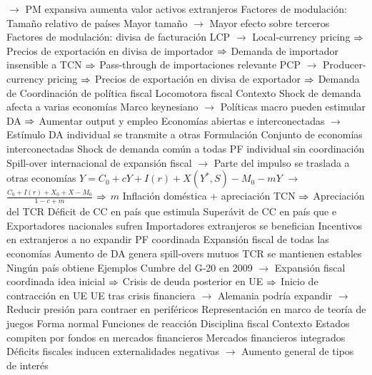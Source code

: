 \documentclass{nuevotema}
\begin{document}
\begin{esquemal}
				\4[] $\to$ PM expansiva aumenta valor activos extranjeros
				\4 Factores de modulación:  Tamaño relativo de países
				\4[] Mayor tamaño
				\4[] $\to$ Mayor efecto sobre terceros
				\4 Factores de modulación: divisa de facturación
				\4[] LCP
				\4[] $\to$ Local-currency pricing
				\4[] $\then$ Precios de exportación en divisa de importador
				\4[] $\then$ Demanda de importador insensible a TCN
				\4[] $\then$ Pass-through de importaciones relevante
				\4[] PCP
				\4[] $\to$ Producer-currency pricing
				\4[] $\then$ Precios de exportación en divisa de exportador
				\4[] $\then$ Demanda de
		\2 Coordinación de política fiscal
			\3 Locomotora fiscal
				\4 Contexto
				\4[] Shock de demanda afecta a varias economías
				\4[] Marco keynesiano
				\4[] $\to$ Políticas macro pueden estimular DA
				\4[] $\then$ Aumentar output y empleo
				\4[] Economías abiertas e interconectadas
				\4[] $\to$ Estímulo DA individual se transmite a otras
				\4 Formulación
				\4[] Conjunto de economías interconectadas
				\4[] Shock de demanda común a todas
				\4 PF individual sin coordinación
				\4[] Spill-over internacional de expansión fiscal
				\4[] $\to$ Parte del impulso se traslada a otras economías
				\4[] $Y = C_0 + c Y + I(r) +X (Y^*, S) - M_0 - mY$
				\4[] $\to$ $\frac{C_0 + I(r) + X_0 + X - M_0}{1-c+m}$
				\4[] $\then$ $m$
				\4[] Inflación doméstica + apreciación TCN
				\4[] $\then$ Apreciación del TCR
				\4[$\then$] Déficit de CC en país que estimula
				\4[$\then$] Superávit de CC en país que e
				\4[] Exportadores nacionales sufren
				\4[] Importadores extranjeros se benefician
				\4[] Incentivos en extranjeros a no expandir
				\4 PF coordinada
				\4[] Expansión fiscal de todas las economías
				\4[] Aumento de DA genera spill-overs mutuos
				\4[] TCR se mantienen estables
				\4[] Ningún país obtiene
				\4 Ejemplos
				\4[] Cumbre del G-20 en 2009
				\4[] $\to$ Expansión fiscal coordinada idea inicial
				\4[] $\then$ Crisis de deuda posterior en UE
				\4[] $\then$ Inicio de contracción en UE
				\4[] UE tras crisis financiera
				\4[] $\to$ Alemania podría expandir
				\4[] $\to$ Reducir presión para contraer en periféricos
				\4 Representación en marco de teoría de juegos
				\4[] Forma normal
				\4[] 
				\4[] Funciones de reacción
				\4[] 
			\3 Disciplina fiscal
				\4 Contexto
				\4[] Estados compiten por fondos en mercados financieros
				\4[] Mercados financieros integrados
				\4[] Déficits fiscales inducen externalidades negativas
				\4[] $\to$ Aumento general de tipos de interés

\end{esquemal}
\end{document}
